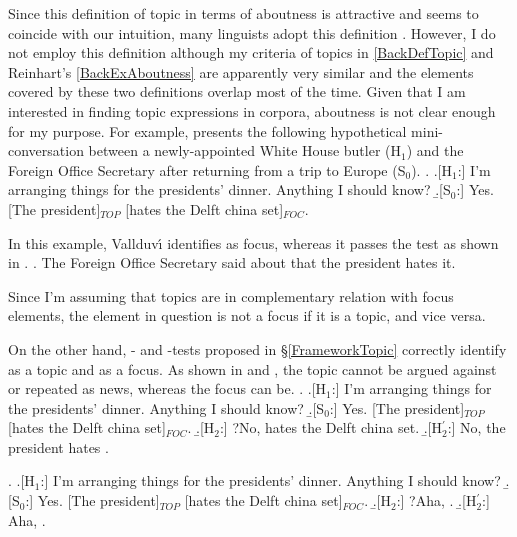 Since this definition of topic in terms of aboutness is attractive and seems to coincide with our intuition,
many linguists adopt this definition \cite[e.g.,][]{lambrecht94,erteschik-shir07}.
However, I do not employ this definition
although my criteria of topics in \ref{BackDefTopic} and Reinhart's \ref{BackExAboutness} are apparently very similar and
the elements covered by these two definitions overlap most of the time.
Given that I am interested in finding topic expressions in corpora,
aboutness is not clear enough for my purpose.
For example,  presents the following hypothetical mini-conversation between a newly-appointed White House butler (H$_{1}$) and the Foreign Office Secretary after returning from a trip to Europe (S$_{0}$).
%
\ex. \a.[H$_{1}$:] I'm arranging things for the presidents' dinner. Anything I should know?
     \b.[S$_{0}$:] Yes. [The president]$_{TOP}$ [hates the Delft china set]$_{FOC}$.\\
     \begin{flushright}
     {\cite[p.~9, 12]{vallduvi94}}
     \end{flushright}

In this example, Vallduv\'{\i} identifies  as focus,
whereas it passes the  test as shown in \Next.
%
\ex. The Foreign Office Secretary said about  that the president hates it.

Since I'm assuming that topics are in complementary relation with focus elements,
the element in question is not a focus if it is a topic, and vice versa.

On the other hand, - and -tests proposed in \S \ref{FrameworkTopic} correctly identify  as a topic and  as a focus.
As shown in \Next[H$_{2}$] and \NNext[H$_{2}$],
the topic  cannot be argued against or repeated as news,
whereas the focus  can be.
%
\ex. \a.[H$_{1}$:] I'm arranging things for the presidents' dinner. Anything I should know?
     \b.[S$_{0}$:] Yes. [The president]$_{TOP}$ [hates the Delft china set]$_{FOC}$.
     \b.[H$_{2}$:] ?No,  hates the Delft china set.
     \b.[H$_{2}^{\prime}$:] No, the president hates .

\ex. \a.[H$_{1}$:] I'm arranging things for the presidents' dinner. Anything I should know?
     \b.[S$_{0}$:] Yes. [The president]$_{TOP}$ [hates the Delft china set]$_{FOC}$.
     \b.[H$_{2}$:] ?Aha, .
     \b.[H$_{2}^{\prime}$:] Aha, .


